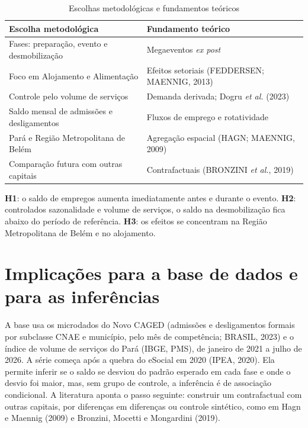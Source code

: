 \begin{table}[h]
  \centering
  \caption{Escolhas metodológicas e fundamentos teóricos}
  \label{tab:arcabouco}
  \small
  \begin{tabularx}{\textwidth}{Xl}
    \toprule
    \textbf{Escolha metodológica} & \textbf{Fundamento teórico} \\
    \midrule
    Fases: preparação, evento e desmobilização & Megaeventos \textit{ex post} \\
    Foco em Alojamento e Alimentação & Efeitos setoriais (FEDDERSEN; MAENNIG, 2013) \\
    Controle pelo volume de serviços & Demanda derivada; Dogru \textit{et al.} (2023) \\
    Saldo mensal de admissões e desligamentos & Fluxos de emprego e rotatividade \\
    Pará e Região Metropolitana de Belém & Agregação espacial (HAGN; MAENNIG, 2009) \\
    Comparação futura com outras capitais & Contrafactuais (BRONZINI \textit{et al.}, 2019) \\
    \bottomrule
  \end{tabularx}
\end{table}

\textbf{H1}: o saldo de empregos aumenta imediatamente antes e durante o
evento. \textbf{H2}: controlados sazonalidade e volume de serviços, o saldo na
desmobilização fica abaixo do período de referência. \textbf{H3}: os efeitos se
concentram na Região Metropolitana de Belém e no alojamento.

\section{Implicações para a base de dados e para as inferências}

A base usa os microdados do Novo CAGED (admissões e desligamentos formais por
subclasse CNAE e município, pelo mês de competência; BRASIL, 2023) e o índice
de volume de serviços do Pará (IBGE, PMS), de janeiro de 2021 a julho de 2026.
A série começa após a quebra do eSocial em 2020 (IPEA, 2020). Ela permite
inferir se o saldo se desviou do padrão esperado em cada fase e onde o desvio
foi maior, mas, sem grupo de controle, a inferência é de associação
condicional. A literatura aponta o passo seguinte: construir um contrafactual
com outras capitais, por diferenças em diferenças ou controle sintético, como
em Hagn e Maennig (2009) e Bronzini, Mocetti e Mongardini (2019).

